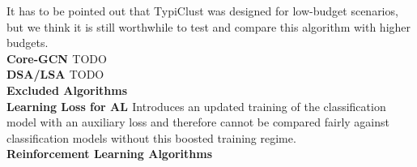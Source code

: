 \documentclass[]{article}
\begin{document}
It has to be pointed out that TypiClust was designed for low-budget scenarios, but we think it is still worthwhile to test and compare this algorithm with higher budgets. \\
\textbf{Core-GCN \cite{caramalau2021sequential}} TODO \\
\textbf{DSA/LSA \cite{kim2019guiding}} TODO \\ [2mm]
%
\textbf{Excluded Algorithms}\\
\textbf{Learning Loss for AL \cite{yoo2019learning}}
Introduces an updated training of the classification model with an auxiliary loss and therefore cannot be compared fairly against classification models without this boosted training regime.\\ [1mm]
%
\textbf{Reinforcement Learning Algorithms} \\


\end{document}
